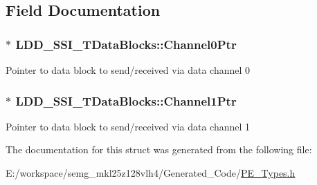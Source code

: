 \subsection{Field Documentation}
\hypertarget{struct_l_d_d___s_s_i___t_data_blocks_a8b1b9f1fd6075f9d9975f1506ac64a16}{
\subsubsection[{Channel0\-Ptr}]{$\ast$ L\-D\-D\-\_\-\-S\-S\-I\-\_\-\-T\-Data\-Blocks\-::\-Channel0\-Ptr}}\label{struct_l_d_d___s_s_i___t_data_blocks_a8b1b9f1fd6075f9d9975f1506ac64a16}
Pointer to data block to send/received via data channel 0 \hypertarget{struct_l_d_d___s_s_i___t_data_blocks_a5c0e65fe82f88a245123217769316fef}{
\subsubsection[{Channel1\-Ptr}]{$\ast$ L\-D\-D\-\_\-\-S\-S\-I\-\_\-\-T\-Data\-Blocks\-::\-Channel1\-Ptr}}\label{struct_l_d_d___s_s_i___t_data_blocks_a5c0e65fe82f88a245123217769316fef}
Pointer to data block to send/received via data channel 1 

The documentation for this struct was generated from the following file\-:\begin{DoxyCompactItemize}
\item 
E\-:/workspace/semg\-\_\-mkl25z128vlh4/\-Generated\-\_\-\-Code/\hyperlink{_p_e___types_8h}{P\-E\-\_\-\-Types.\-h}\end{DoxyCompactItemize}

